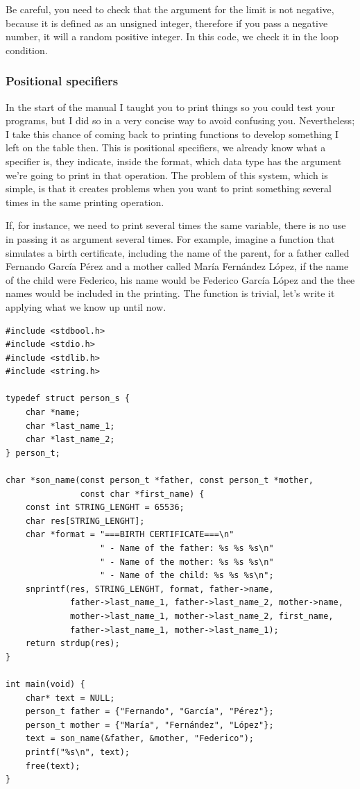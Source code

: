 \documentclass[a4paper]{article}
\begin{document}
Be careful, you need to check that the argument for the limit is not negative,
because it is defined as an unsigned integer, therefore if you pass a negative
number, it will a random positive integer. In this code, we check it in the
loop condition.

\subsubsection{Positional specifiers}
In the start of the manual I taught you to print things so you could test your
programs, but I did so in a very concise way to avoid confusing you.
Nevertheless; I take this chance of coming back to printing functions to
develop something I left on the table then. This is positional specifiers,
we already know what a specifier is, they indicate, inside the format, which
data type has the argument we're going to print in that operation. The problem
of this system, which is simple, is that it creates problems when you want to
print something several times in the same printing operation.

If, for instance, we need to print several times the same variable, there is
no use in passing it as argument several times. For example, imagine a function
that simulates a birth certificate, including the name of the parent, for a
father called Fernando García Pérez and a mother called María Fernández López,
if the name of the child were Federico, his name would be Federico García López
and the thee names would be included in the printing. The function is trivial,
let's write it applying what we know up until now.

\noindent
\begin{minipage}[H]{\linewidth}
\mbox{}
\begin{lstlisting}[style=C,
caption={Example of printing with repeated argument},
label={lst:repeatedMessages}]
#include <stdbool.h>
#include <stdio.h>
#include <stdlib.h>
#include <string.h>

typedef struct person_s {
    char *name;
    char *last_name_1;
    char *last_name_2;
} person_t;

char *son_name(const person_t *father, const person_t *mother,
               const char *first_name) {
    const int STRING_LENGHT = 65536;
    char res[STRING_LENGHT];
    char *format = "===BIRTH CERTIFICATE===\n"
                   " - Name of the father: %s %s %s\n"
                   " - Name of the mother: %s %s %s\n"
                   " - Name of the child: %s %s %s\n";
    snprintf(res, STRING_LENGHT, format, father->name,
             father->last_name_1, father->last_name_2, mother->name,
             mother->last_name_1, mother->last_name_2, first_name,
             father->last_name_1, mother->last_name_1);
    return strdup(res);
}

int main(void) {
    char* text = NULL;
    person_t father = {"Fernando", "García", "Pérez"};
    person_t mother = {"María", "Fernández", "López"};
    text = son_name(&father, &mother, "Federico");
    printf("%s\n", text);
    free(text);
}
\end{lstlisting}
\end{minipage}
\end{document}
